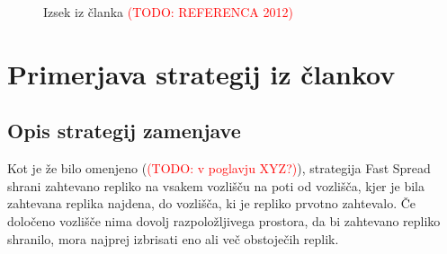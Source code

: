 \documentclass[a4paper, 12pt]{book}
\newcommand{\TODO}[1]{\textcolor{red}{(TODO: #1)}}
\begin{document}
\begin{figure}
  \begin{center}
  \end{center}
  \caption{Izsek iz članka \TODO{REFERENCA 2012}}
  \label{pic2012}
\end{figure}



\chapter{Primerjava strategij iz člankov}

\section{Opis strategij zamenjave}
Kot je že bilo omenjeno (\TODO{v poglavju XYZ?}), strategija Fast Spread
shrani zahtevano repliko na vsakem vozlišču na poti od vozlišča, kjer je
bila zahtevana replika najdena, do vozlišča, ki je repliko prvotno
zahtevalo. Če določeno vozlišče nima dovolj razpoložljivega prostora,
da bi zahtevano repliko shranilo, mora najprej izbrisati eno ali več
obstoječih replik.
\end{document}
